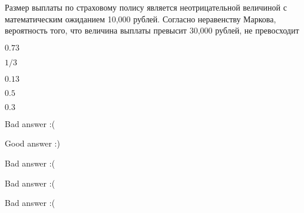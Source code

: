 
\begin{question}
Размер выплаты по страховому полису является неотрицательной величиной с
математическим ожиданием 10,000 рублей. Согласно неравенству Маркова,
вероятность того, что величина выплаты превысит 30,000 рублей, не
превосходит
\begin{answerlist}
  \item \(0.73\)
  \item \(1/3\)
  \item \(0.13\)
  \item \(0.5\)
  \item \(0.3\)
\end{answerlist}
\end{question}

\begin{solution}
\begin{answerlist}
  \item Bad answer :(
  \item Good answer :)
  \item Bad answer :(
  \item Bad answer :(
  \item Bad answer :(
\end{answerlist}
\end{solution}

